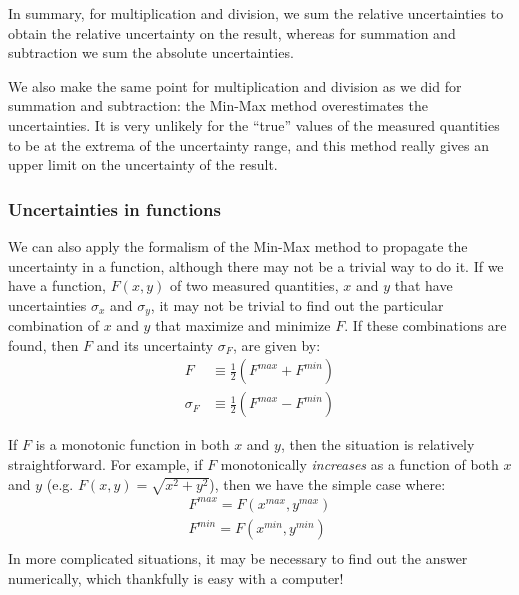 In summary, for multiplication and division, we sum the relative uncertainties to obtain the relative uncertainty on the result, whereas for summation and subtraction we sum the absolute uncertainties.

We also make the same point for multiplication and division as we did for summation and subtraction: the Min-Max method overestimates the uncertainties. It is very unlikely for the ``true'' values of the measured quantities to be at the extrema of the uncertainty range, and this method really gives an upper limit on the uncertainty of the result.

\subsubsection{Uncertainties in functions}
We can also apply the formalism of the Min-Max method to propagate the uncertainty in a function, although there may not be a trivial way to do it. If we have a function, $F(x,y)$ of two measured quantities, $x$ and $y$ that have uncertainties $\sigma_{x}$ and $\sigma_{y}$, it may not be trivial to find out the particular combination of $x$ and $y$ that maximize and minimize $F$. If these combinations are found, then $F$ and its uncertainty $\sigma_{F}$, are given by:
\begin{align}
F&\equiv\frac{1}{2}(F^{max}+F^{min})\nonumber\\
\sigma_{F}&\equiv\frac{1}{2}(F^{max}-F^{min})
\end{align}

If $F$ is a monotonic function in both $x$ and $y$, then the situation is relatively straightforward. For example, if $F$ monotonically \textit{increases} as a function of both $x$ and $y$ (e.g. $F(x,y)=\sqrt{x^2+y^2}$), then we have the simple case where:
\begin{align*}
F^{max}=F(x^{max},y^{max})\\
F^{min}=F(x^{min},y^{min})\\
\end{align*}
In more complicated situations, it may be necessary to find out the answer numerically, which thankfully is easy with a computer!

